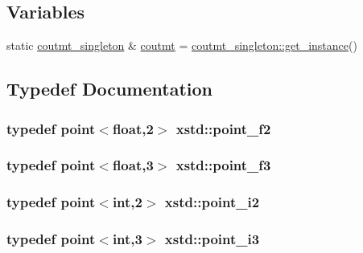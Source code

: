 \subsection*{Variables}
\begin{DoxyCompactItemize}
\item 
static \hyperlink{classxstd_1_1coutmt__singleton}{coutmt\-\_\-singleton} \& \hyperlink{namespacexstd_a1c69cb70a76dfa8ff13085c781a15f27}{coutmt} = \hyperlink{classxstd_1_1coutmt__singleton_a0c478170b82e253a79c51160fe7049a2}{coutmt\-\_\-singleton\-::get\-\_\-instance}()
\end{DoxyCompactItemize}


\subsection{Typedef Documentation}
\hypertarget{namespacexstd_aa26f7d45c70ace7cd0722a5d5d89dcd8}{
\subsubsection[{point\-\_\-f2}]{\setlength{\rightskip}{0pt plus 5cm}typedef {\bf point}$<$float,2$>$ {\bf xstd\-::point\-\_\-f2}}}\label{namespacexstd_aa26f7d45c70ace7cd0722a5d5d89dcd8}
\hypertarget{namespacexstd_ac9dcb9387fb1c6f4f82773a54bfa5843}{
\subsubsection[{point\-\_\-f3}]{\setlength{\rightskip}{0pt plus 5cm}typedef {\bf point}$<$float,3$>$ {\bf xstd\-::point\-\_\-f3}}}\label{namespacexstd_ac9dcb9387fb1c6f4f82773a54bfa5843}
\hypertarget{namespacexstd_a05f630b2b093cec28fcdd96aca897f75}{
\subsubsection[{point\-\_\-i2}]{\setlength{\rightskip}{0pt plus 5cm}typedef {\bf point}$<$int,2$>$ {\bf xstd\-::point\-\_\-i2}}}\label{namespacexstd_a05f630b2b093cec28fcdd96aca897f75}
\hypertarget{namespacexstd_a28fb4f569d80e07173722c8cc3465f81}{
\subsubsection[{point\-\_\-i3}]{\setlength{\rightskip}{0pt plus 5cm}typedef {\bf point}$<$int,3$>$ {\bf xstd\-::point\-\_\-i3}}}\label{namespacexstd_a28fb4f569d80e07173722c8cc3465f81}


